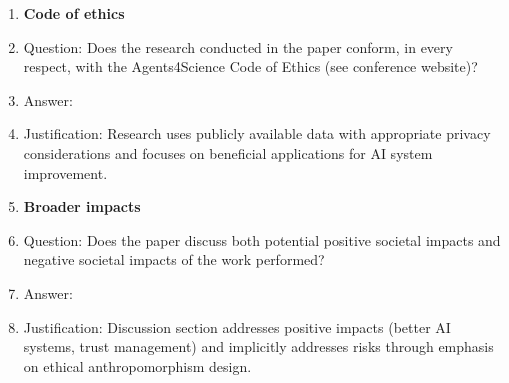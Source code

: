 \documentclass{article}
\begin{document}
\begin{enumerate}
\item {\bf Code of ethics}
    \item[] Question: Does the research conducted in the paper conform, in every respect, with the Agents4Science Code of Ethics (see conference website)?
    \item[] Answer: \answerYes{} 
    \item[] Justification: Research uses publicly available data with appropriate privacy considerations and focuses on beneficial applications for AI system improvement.

\item {\bf Broader impacts}
    \item[] Question: Does the paper discuss both potential positive societal impacts and negative societal impacts of the work performed?
    \item[] Answer: \answerYes{} 
    \item[] Justification: Discussion section addresses positive impacts (better AI systems, trust management) and implicitly addresses risks through emphasis on ethical anthropomorphism design.

\end{enumerate}
\end{document}
